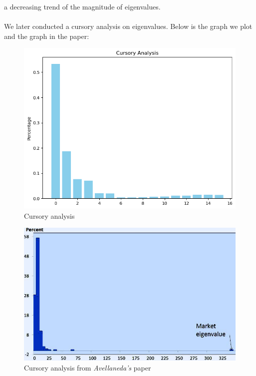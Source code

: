 \documentclass[12pt, letterpaper, twoside]{article}
\begin{document}
    a decreasing trend of the magnitude of eigenvalues.\\\\
    We later conducted a cursory analysis on eigenvalues. 
    Below is the graph we plot and the graph in the paper:
    \begin{figure}[h]
        \centering
        \includegraphics[width=0.8\linewidth]{cursory.png}
        \caption{Cursory analysis}
    \end{figure}
    \begin{figure}[h]
        \centering
        \includegraphics[width=0.8\linewidth]{paper2.jpg}
        \caption{Cursory analysis from \textit{Avellaneda's} paper}
    \end{figure}
\end{document}
